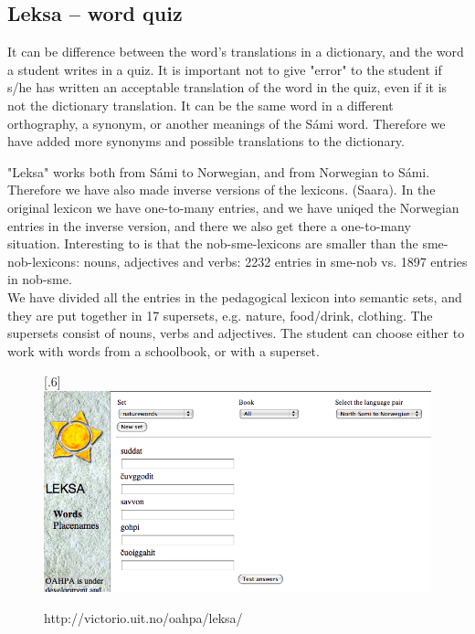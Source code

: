 \documentclass[a4paper,12pt]{article}
\begin{document}
\subsection{Leksa -- word quiz}
It can be difference between the word's translations in a dictionary, and the word a student writes in a quiz. It is important not to give "error" to the student if s/he has written an acceptable translation of the word in the quiz, even if it is not the dictionary translation. It can be the same word in a different orthography, a synonym, or another meanings of the Sámi word. Therefore we have added more synonyms and possible translations to the dictionary.

"Leksa" works both from Sámi to Norwegian, and from Norwegian to Sámi. Therefore we have also made inverse versions of the lexicons. (Saara). In the original lexicon we have one-to-many entries, and we have uniqed the Norwegian entries in the inverse version, and there we also get there a one-to-many situation. Interesting to is that the nob-sme-lexicons are smaller than the sme-nob-lexicons: nouns, adjectives and verbs: 2232 entries in sme-nob vs. 1897 entries in nob-sme.\\ 

We have divided all the entries in the pedagogical lexicon into semantic sets, and they are put together in 17 supersets, e.g. nature, food/drink, clothing. The supersets consist of nouns, verbs and adjectives. The student can choose either to work with words from a schoolbook, or with a superset. 
\vspace{0.5cm}

\begin{figure}[htbp]
\begin{center}
\scalebox{.6}[.6]{\includegraphics{img/leksa.png}}\\
\caption{http://victorio.uit.no/oahpa/leksa/}
\label{leksa}
\end{center}
\end{figure}
\end{document}
